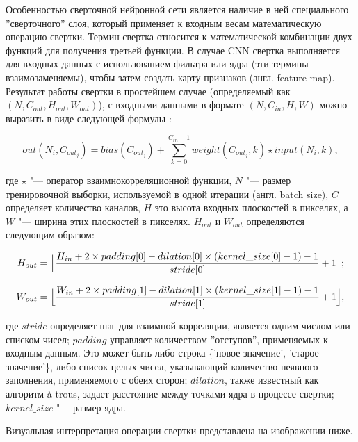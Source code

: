 \documentclass[bachelor, och, coursework]{SCWorks}
\begin{document}
        Особенностью сверточной нейронной сети является наличие в ней
        специального ''сверточного'' слоя, который применяет к входным весам
        математическую операцию свертки. Термин свертка относится к
        математической комбинации двух функций для получения третьей функции. В
        случае CNN свертка выполняется для входных данных с использованием
        фильтра или ядра (эти термины взаимозаменяемы), чтобы затем создать
        карту признаков (англ. feature map). Результат работы свертки в
        простейшем случае (определяемый как $(N, C_{out}, H_{out}, W_{out})$), с
        входными данными в формате $(N, C_{in}, H, W)$ можно выразить в виде
        следующей формулы \cite{convolute}:
        
        \[out(N_i, C_{out_j}) = bias(C_{out_j}) + \sum_{k = 0}^{C_{in} - 1}
        weight(C_{out_j}, k) \star input(N_i, k) ,\]

        где $\star$ "--- оператор взаимнокорреляционной функции, $N$ "--- размер
        тренировочной выборки, используемой в одной итерации (англ. batch size),
        $C$ определяет количество каналов, $H$ это высота входных плоскостей в
        пикселях, а $W$ "--- ширина этих плоскостей в пикселях. $H_{out}$ и
        $W_{out}$ определяются следующим образом:
        
        \[H_{out} = \Bigl\lfloor \frac{H_{in} + 2 \times padding[0] -
        dilation[0] \times (kernel\_size[0] - 1) - 1}{stride[0]} + 1
        \Bigr\rfloor ;\]

        \[W_{out} = \Bigl\lfloor \frac{W_{in} + 2 \times padding[1] -
        dilation[1] \times (kernel\_size[1] - 1) - 1}{stride[1]} + 1
        \Bigr\rfloor ,\]

        где $stride$ определяет шаг для взаимной корреляции, является одним
        числом или списком чисел; $padding$ управляет количеством ''отступов'',
        применяемых к входным данным. Это может быть либо строка \{'новое
        значение', 'старое значение'\}, либо список целых чисел, указывающий
        количество неявного заполнения, применяемого с обеих сторон; $dilation$,
        также известный как алгоритм à trous, задает расстояние между точками
        ядра в процессе свертки; $kernel\_size$ "--- размер ядра.

        Визуальная интерпретация операции свертки представлена на изображении
        ниже.
\end{document}

